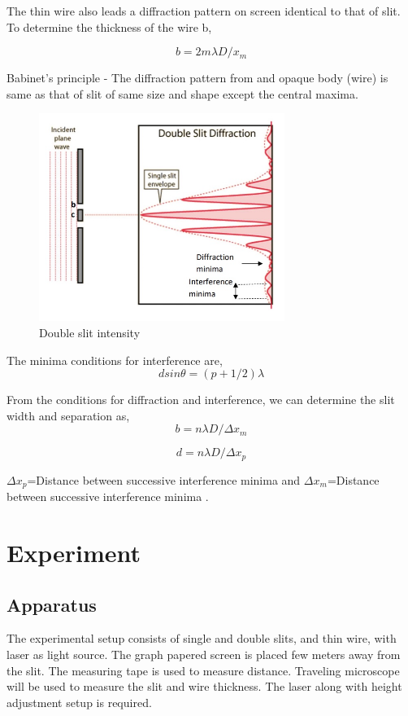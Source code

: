 \documentclass[a4paper, amsfonts, amssymb, amsmath, reprint, showkeys, nofootinbib, twoside]{revtex4-1}
\begin{document}
The thin wire also leads a diffraction pattern on screen identical to that of slit. To determine the thickness of the wire b, 

\begin{equation}
	b= 2m\lambda D/x_m
\end{equation}

Babinet's principle - The diffraction pattern from and opaque body (wire) is same as that of slit of same size and shape except the central maxima. 

\begin{figure}[htbp] %
	\centering
	\includegraphics[width=8cm]{6} 
	\caption{Double slit intensity}
\end{figure}

The minima conditions for interference are,
\begin{equation}
	d sin\theta= (p+1/2)\lambda
\end{equation}

From the conditions for diffraction and interference, we can determine the slit width and separation as,
\begin{equation}
	b= n\lambda D/\Delta x_m
\end{equation}

\begin{equation}
	d= n\lambda D/\Delta x_p
\end{equation}

$\Delta x_p$=Distance between successive interference minima and $\Delta x_m$=Distance between successive interference minima .

\section{Experiment}
\subsection{Apparatus}
The experimental setup consists of single and double slits, and thin wire, with laser as light source. The graph papered screen is placed few meters away from the slit. The measuring tape is used to measure distance. Traveling microscope will be used to measure the slit and wire thickness. The laser along with height adjustment setup is required.  
\end{document}
